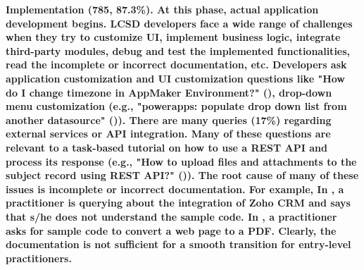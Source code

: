 
\bf{Implementation (785, 87.3\%).} At this phase, actual application development begins. LCSD developers face a wide range of challenges when they try to customize UI, implement business logic, integrate third-party modules, debug and test the implemented functionalities, read the incomplete or incorrect documentation, etc. Developers ask application customization and UI customization questions like "How do I change timezone in AppMaker Environment?" (), drop-down menu customization (e.g., "powerapps: populate drop down list from another datasource" ()). There are many queries (17\%) regarding external services or API integration. Many of these questions are relevant to a task-based tutorial on how to use a REST API and process its response (e.g., "How to upload files and attachments to the subject record using REST API?" ()). The root cause of many of these issues is incomplete or incorrect documentation. For example, In , a practitioner is querying about the integration of Zoho CRM and says that s/he does not understand the sample code. In , a practitioner asks for sample code to convert a web page to a PDF. Clearly, the documentation is not sufficient for a smooth transition for entry-level practitioners.







